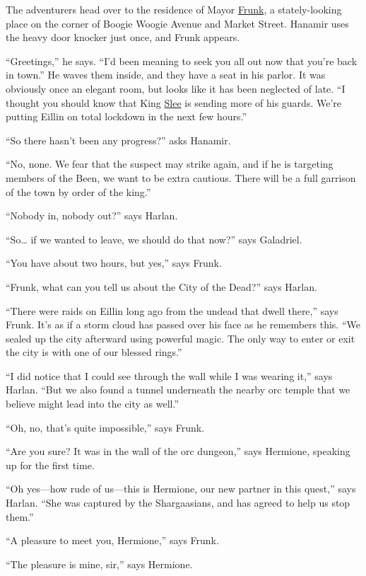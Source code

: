 \documentclass[smalldemyvopaper,11pt,twoside,onecolumn,openright,extrafontsizes]{memoir}
\begin{document}
The adventurers head over to the residence of Mayor
\href{/characters/frunk/}{Frunk}, a stately-looking place on the corner
of Boogie Woogie Avenue and Market Street. Hanamir uses the heavy door
knocker just once, and Frunk appears.

``Greetings,'' he says. ``I'd been meaning to seek you all out now that
you're back in town.'' He waves them inside, and they have a seat in his
parlor. It was obviously once an elegant room, but looks like it has
been neglected of late. ``I thought you should know that King
\href{/characters/slee/}{Slee} is sending more of his guards. We're
putting Eillin on total lockdown in the next few hours.''

``So there hasn't been any progress?'' asks Hanamir.

``No, none. We fear that the suspect may strike again, and if he is
targeting members of the Been, we want to be extra cautious. There will
be a full garrison of the town by order of the king.''

``Nobody in, nobody out?'' says Harlan.

``So\ldots{} if we wanted to leave, we should do that now?'' says
Galadriel.

``You have about two hours, but yes,'' says Frunk.

``Frunk, what can you tell us about the City of the Dead?'' says Harlan.

``There were raids on Eillin long ago from the undead that dwell
there,'' says Frunk. It's as if a storm cloud has passed over his face
as he remembers this. ``We sealed up the city afterward using powerful
magic. The only way to enter or exit the city is with one of our blessed
rings.''

``I did notice that I could see through the wall while I was wearing
it,'' says Harlan. ``But we also found a tunnel underneath the nearby
orc temple that we believe might lead into the city as well.''

``Oh, no, that's quite impossible,'' says Frunk.

``Are you sure? It was in the wall of the orc dungeon,'' says Hermione,
speaking up for the first time.

``Oh yes---how rude of us---this is Hermione, our new partner in this
quest,'' says Harlan. ``She was captured by the Shargaasians, and has
agreed to help us stop them.''

``A pleasure to meet you, Hermione,'' says Frunk.

``The pleasure is mine, sir,'' says Hermione.
\end{document}
